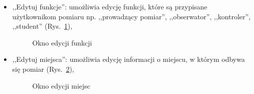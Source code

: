 \begin{itemize}
\begin{itemize}
\item ,,Edytuj funkcje'': umożliwia edycję funkcji, które są przypisane użytkownikom pomiaru np. ,,prowadzący pomiar'', ,,obserwator'', ,,kontroler'', ,,student'' (Rys.~\ref{editFunction}),

\begin{figure}[!htb]
\centering 		
  \hspace{2mm}
\caption{Okno edycji funkcji} 	
\label{editFunction}
\end{figure}

\item ,,Edytuj miejsca'': umożliwia edycję informacji o miejscu, w którym odbywa się pomiar (Rys.~\ref{editPlace}),

\begin{figure}[!htb]
\centering 		
  \hspace{2mm}
\caption{Okno edycji miejsc} 	
\label{editPlace}
\end{figure}


\end{itemize}
\end{itemize}
